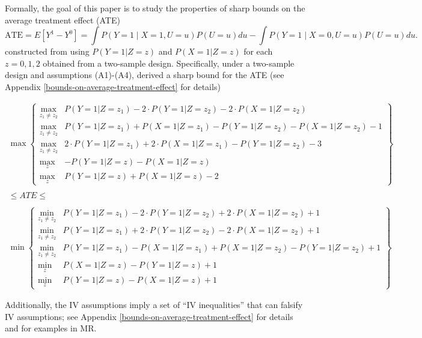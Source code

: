 \documentclass[
]{article}
\theoremstyle{plain}
\begin{document}
Formally, the goal of this paper is to study the properties of sharp bounds on the average treatment effect (ATE)
\[
\text{ATE} = E[Y^1 - Y^0] = \int P(Y=1 \mid X = 1, U=u) P(U=u) du - \int P(Y=1 \mid X = 0, U=u) P(U=u) du.
\]
constructed from using \(P(Y = 1 | Z = z)\) and \(P(X = 1 | Z = z)\) for each \(z=0,1,2\) obtained from a two-sample design. Specifically, under a two-sample design and assumptions (A1)-(A4), \textcite{ramsahai_causal_2012} derived a sharp bound for the ATE (see Appendix \ref{bounds-on-average-treatment-effect} for details)

\begin{gather}
\max \left \{
\begin{array}{ll}
  \max_{z_1 \neq z_2} & P(Y = 1 | Z = z_1) - 2\cdot P(Y = 1 | Z = z_2) - 2\cdot P(X = 1 | Z = z_2) \\
  \max_{z_1 \neq z_2} & P(Y = 1 | Z = z_1) + P(X = 1 | Z = z_1) - P(Y = 1 | Z = z_2) - P(X = 1 | Z = z_2) - 1 \\
  \max_{z_1 \neq z_2} & 2\cdot P(Y = 1 | Z = z_1) + 2\cdot P(X = 1 | Z = z_1) - P(Y = 1 | Z = z_2) - 3 \\
  \max_z & -P(Y = 1 | Z = z) - P(X = 1 | Z = z) \\
  \max_z & P(Y = 1 | Z = z) +  P(X = 1 | Z = z) - 2
\end{array}
\right \} \nonumber \\ \nonumber \\
\le ATE \le \label{eq:ate_bound} \\ \nonumber \\
\min \left \{
\begin{array}{ll}
  \min_{z_1 \neq z_2} & P(Y = 1 | Z = z_1) - 2\cdot P(Y = 1 | Z = z_2) +  2\cdot P(X = 1 | Z = z_2) + 1 \\
  \min_{z_1 \neq z_2} & P(Y = 1 | Z = z_1) + 2\cdot P(Y = 1 | Z = z_2) -  2\cdot P(X = 1 | Z = z_2) + 1 \\
  \min_{z_1 \neq z_2} & P(Y = 1 | Z = z_1) - P(X = 1 | Z = z_1) + P(X = 1 | Z = z_2) - P(Y = 1 | Z = z_2) + 1 \\
  \min_z & P(X = 1 | Z = z) - P(Y = 1 | Z = z) + 1 \\
  \min_z & P(Y = 1 | Z = z) - P(X = 1 | Z = z) + 1 
\end{array} 
\right \} \nonumber
\end{gather}

Additionally, the IV assumptions imply a set of ``IV inequalities'' \autocite{balke_bounds_1997} that can falsify IV assumptions; see Appendix \ref{bounds-on-average-treatment-effect} for details and \textcite{diemer_application_2020} for examples in MR.
\end{document}
